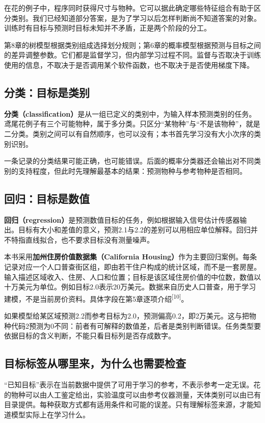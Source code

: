 在花的例子中，程序同时获得尺寸与物种。它可以据此确定哪些特征组合有助于区分类别。我们已经知道部分答案，是为了学习以后怎样判断尚不知道答案的对象。训练时有目标与预测时目标未知并不矛盾，正是两个阶段的分工。

第8章的树模型根据类别组成选择划分规则；第6章的概率模型根据预测与目标之间的差异调整参数。它们都是监督学习，但内部学习过程不同。监督与否取决于训练使用的信息，不取决于是否调用某个软件函数，也不取决于是否使用梯度下降。

\subsection{分类：目标是类别}
\textbf{分类（classification）}是从一组已定义的类别中，为输入样本预测类别的任务。鸢尾花例子有三个可能物种，属于多分类。只区分“某物种”与“不是该物种”，就是二分类。类别之间可以有自然顺序，也可以没有；本书首先学习没有大小次序的类别识别。

一条记录的分类结果可能正确，也可能错误。后面的概率分类器还会输出对不同类别的支持程度，但此时先理解最基本的结果：预测物种与参考物种是否相同。

\subsection{回归：目标是数值}
\textbf{回归（regression）}是预测数值目标的任务，例如根据输入信号估计传感器输出。目标有大小和差值的意义，预测2.1与2.2的差别可以用相应单位解释。回归并不特指直线拟合，也不要求目标没有测量噪声。

本书采用\textbf{加州住房价值数据集（California Housing）}作为主要回归案例。每条记录对应一个人口普查街区组，即由若干住户构成的统计区域，而不是一套房屋。输入描述区域收入、住房、人口和位置；目标是该区域住房价值的中位数，数值以十万美元为单位。例如目标2.0表示20万美元。数据来自历史人口普查，用于学习建模，不是当前房价资料。具体字段在第5章逐项介绍\textsuperscript{[10]}。

如果模型给某区域预测2.2而参考目标为2.0，预测偏高0.2，即2万美元。这与把物种代码2预测为0不同：前者有可解释的数值差，后者是类别判断错误。任务类型要依据目标的含义判断，不能只看目标列是否存成数字。

\subsection{目标标签从哪里来，为什么也需要检查}
“已知目标”表示在当前数据中提供了可用于学习的参考，不表示参考一定无误。花的物种可以由人工鉴定给出，实验温度可以由参考仪器测量，天体类别可以由已有目录提供。每种获取方式都有适用条件和可能的误差。只有理解标签来源，才能知道模型实际上在学习什么。


